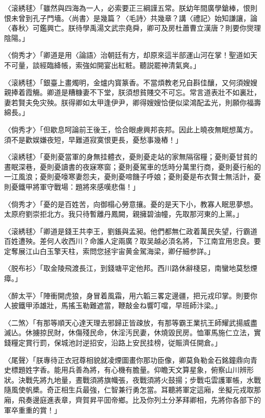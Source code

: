 〈滚綉毬〉「雖然與四海為一人，必索要正三綱謹五常。朕幼年間廣學鎗棒，恨則恨未曾到孔子門墻。〈尚書〉是幾篇？〈毛詩〉共幾章？講〈禮記〉始知謙讓，論〈春秋〉可鑑興亡。朕待學禹湯文武宗堯舜，卿可及房杜蕭曹立漢唐？則要你爕理陰陽。」

〈倘秀才〉「卿道是用〈論語〉治朝廷有方，却原來這半部運山河在掌！聖道如天不可量，談經臨絳帳，索強如開宴出紅粧。聽説罷神清氣爽。」

〈滚綉毬〉「銀臺上畫燭明，金爐内寳篆香。不當煩教老兄自斟佳釀，又何須嫂嫂親捧着霞觴。卿道是糟糠妻不下堂，朕須想貧賤交不可忘。常言道表壯不如裏壯，妻若賢夫免灾殃。朕得卿如太甲逢伊尹，卿得嫂嫂恰便似梁鴻配孟光，則願你福壽綿長。」

〈倘秀才〉「但歇息呵論前王後王，恰合眼慮興邦丧邦。因此上曉夜無眠想萬方。須不是歡娱嫌夜短，早難道寂寞恨更長，憂愁事幾樁！」

〈滚綉毬〉「憂則憂當軍的身無挂體衣，憂則憂走站的家無隔宿糧；憂則憂甘貧的晝眠深巷，憂則憂讀書的夜寐寒窗；憂則憂駕車的恁時分萬里行商，憂則憂行船的一江風浪；憂則憂嚎寒妻怨夫，憂則憂啼饑子呼娘；憂則憂是布衣賢士無活計，憂則憂鐵甲將軍守戰場：題將來感嘆悲傷！」

〈倘秀才〉「憂的是百姓苦，向御榻心勞意攘。憂的是天下小，教寡人眠思夢想。太原府劉崇拒北方。我只待暫離丹鳳闕，親擁碧油幢，先取那河東的上黨。」

〈滚綉毬〉「卿道是錢王共李王，劉鋹與孟昶。他們都無仁政着萬民失望，行霸道百姓遭殃。差何人收西川？命誰人定兩廣？取吴越必湏名將，下江南宜用忠良。要定奪展江山白玉擎天柱，索問您拯宇宙黄金駕海梁，卿仔細参詳。」

〈脱布衫〉「取金陵飛渡長江，到錢塘平定他邦。西川路休辭棧惡，南蠻地莫愁煙瘴。」

〈醉太平〉「陣衝開虎狼，身冒着風霜，用六韜三畧定邊疆，把元戎印掌。則要你人披鐵甲添雄壯，馬搖玉勒難遮當，鞭敲金ね響叮噹，早班師汴梁。」　

〈二煞〉「有那等順天心達天理去邪歸正皆疎放，有那等霸王業抗王師耀武揚威盡滅亾。休擄掠民財，休傷殘民命，休淫汚民妻，休燒毀民房。恤軍馬施仁立法，實錢糧定賞行罰，保城池討逆招安，沿路上安民挂榜，従賑濟任開倉。」

〈尾聲〉「朕專待正衣冠尊相貌就凌煙圖畫你那功臣像，卿莫負勒金石銘鐘鼎向青史標題姓字香。能用兵善為將，有心機有膽量。仰瞻天文算星象，俯察山川辨形狀。決戰先將九地量，晝戰須將旗幟張，夜戰須將火鼓揚；步戰屯雲護軍帳，水戰隨風使帆槳。奇正相生兵最強，仁智兼行勇怎當。耳聽將軍定這廂，坐擬元戎取那廂，飛奏邊庭進表章，齊賀昇平囬帝鄉。比及你列土分茅拜卿相，先將你各部下的軍卒重重的賞！」

